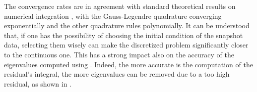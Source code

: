 The convergence rates are in agreement with standard theoretical results on numerical integration \cite{quarteroni_numerical_2007}, with the Gauss-Legendre quadrature converging exponentially and the other quadrature rules polynomially. It can be understood that, if one has the possibility of choosing the initial condition of the snapshot data, selecting them wisely can make the discretized problem significantly closer to the continuous one. This has a strong impact also on the accuracy of the eigenvalues computed using . Indeed, the more accurate is the computation of the residual's integral, the more eigenvalues can be removed due to a too high residual, as shown in .

\begin{figure}[h]
\centering
{}
\end{figure}
